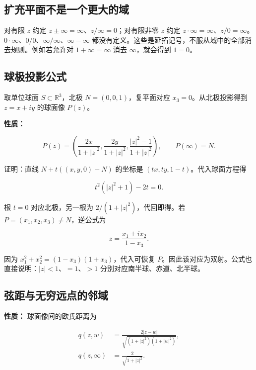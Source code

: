 \documentclass[11pt,a4paper]{article}
\begin{document}
\subsection{扩充平面不是一个更大的域}\label{ux6269ux5145ux5e73ux9762ux4e0dux662fux4e00ux4e2aux66f4ux5927ux7684ux57df}

对有限 \(z\) 约定 \(z\pm\infty=\infty\)、\(z/\infty=0\)；对有限非零
\(z\) 约定
\(z\cdot\infty=\infty\)、\(z/0=\infty\)。\(0\cdot\infty\)、\(0/0\)、\(\infty/\infty\)、\(\infty-\infty\)
都没有定义。这些是延拓记号，不服从域中的全部消去规则。例如若允许对
\(1+\infty=\infty\) 消去 \(\infty\)，就会得到 \(1=0\)。

\subsection{球极投影公式}\label{ux7403ux6781ux6295ux5f71ux516cux5f0f}

取单位球面 \(S\subset\mathbb R^3\)，北极 \(N=(0,0,1)\)，复平面对应
\(x_3=0\)。从北极投影得到 \(z=x+iy\) 的球面像 \(P(z)\)。

\textbf{性质：}

\[
P(z)=\left(\frac{2x}{1+|z|^2},\frac{2y}{1+|z|^2},
\frac{|z|^2-1}{1+|z|^2}\right),\qquad P(\infty)=N.
\]

证明：直线 \(N+t((x,y,0)-N)\) 的坐标是 \((tx,ty,1-t)\)。代入球面方程得

\[
t^2(|z|^2+1)-2t=0.
\]

根 \(t=0\) 对应北极，另一根为 \(2/(1+|z|^2)\)，代回即得。若
\(P=(x_1,x_2,x_3)\ne N\)，逆公式为

\[
z=\frac{x_1+ix_2}{1-x_3}.
\]

因为 \(x_1^2+x_2^2=(1-x_3)(1+x_3)\)，代入可恢复
\(P\)。因此该对应为双射。公式也直接说明：\(|z|<1\)、\(=1\)、\(>1\)
分别对应南半球、赤道、北半球。

\subsection{弦距与无穷远点的邻域}\label{ux5f26ux8dddux4e0eux65e0ux7a77ux8fdcux70b9ux7684ux90bbux57df}

\textbf{性质：} 球面像间的欧氏距离为

\[
\begin{aligned}
q(z,w)&=\frac{2|z-w|}{\sqrt{(1+|z|^2)(1+|w|^2)}},\\
q(z,\infty)&=\frac2{\sqrt{1+|z|^2}}.
\end{aligned}
\]
\end{document}
